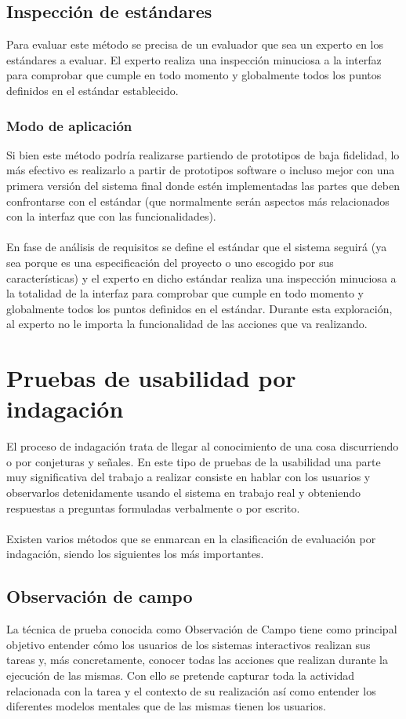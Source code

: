 \subsection{Inspección de estándares}
Para evaluar este método se precisa de un evaluador que sea un experto en los estándares a evaluar. El experto realiza una inspección minuciosa a la interfaz para comprobar que cumple en todo momento y globalmente todos los puntos definidos en el estándar establecido.
\subsubsection{Modo de aplicación}
Si bien este método podría realizarse partiendo de prototipos de baja fidelidad, lo más efectivo es realizarlo a partir de prototipos software o incluso mejor con una primera versión del sistema final donde estén implementadas las partes que deben confrontarse con el estándar (que normalmente serán aspectos más relacionados con la interfaz que con las funcionalidades). \\ \\
En fase de análisis de requisitos se define el estándar que el sistema seguirá (ya sea porque es una especificación del proyecto o uno escogido por sus características) y el experto en dicho estándar realiza una inspección minuciosa a la totalidad de la interfaz para comprobar que cumple en todo momento y globalmente todos los puntos definidos en el estándar. Durante esta exploración, al experto no le importa la funcionalidad de las acciones que va realizando.

\section{Pruebas de usabilidad por indagación}
El proceso de indagación trata de llegar al conocimiento de una cosa discurriendo o por conjeturas y señales. En este tipo de pruebas de la usabilidad una parte muy significativa del trabajo a realizar consiste en hablar con los usuarios y observarlos detenidamente usando el sistema en trabajo real y obteniendo respuestas a preguntas formuladas verbalmente o por escrito. \\ \\
Existen varios métodos que se enmarcan en la clasificación de evaluación por indagación, siendo los siguientes los más importantes.

\subsection{Observación de campo}
La técnica de prueba conocida como Observación de Campo tiene como principal objetivo entender cómo los usuarios de los sistemas interactivos realizan sus tareas y, más concretamente, conocer todas las acciones que realizan durante la ejecución de las mismas. Con ello se pretende capturar toda la actividad relacionada con la tarea y el contexto de su realización así como entender los diferentes modelos mentales que de las mismas tienen los usuarios.
